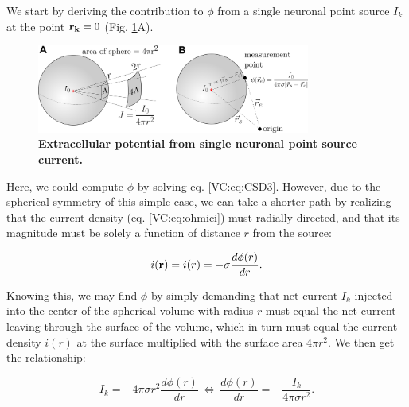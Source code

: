 \subsubsection{}
\label{sec:VC:pointsource}

We start by deriving the contribution to $\phi$ from a single neuronal point source $I_k$ at the point ${\bf r_k}=0$ (Fig. \ref{VC:fig:pointsource}A). 

\begin{figure}[!ht]
\begin{center}
\includegraphics[width=0.8\textwidth]{Figures/VC/EP_from_pointsource_illustration.png}
\end{center}
\caption{\textbf{Extracellular potential from single neuronal point source current.} 
}
\label{VC:fig:pointsource}
\end{figure}

Here, we could compute $\phi$ by solving eq. \ref{VC:eq:CSD3}. However, due to the spherical symmetry of this simple case, we can take a shorter path by realizing that the current density (eq. \ref{VC:eq:ohmici}) must radially directed, and that its magnitude must be solely a function of distance $r$ from the source:

\begin{equation}
i({\bf r}) = i(r) = -\sigma \frac{d\phi(r)}{dr}.
\end{equation}

Knowing this, we may find $\phi$ by simply demanding that net current $I_k$ injected into the center of the spherical volume with radius $r$ must equal the net current leaving through the surface of the volume, which in turn must equal the current density $i(r)$ at the surface multiplied with the surface area $4\pi r^2$. We then get the relationship:

\begin{equation}
I_k = -4\pi \sigma r^2  \frac{d\phi(r)}{dr} \, \iff \, \frac{d\phi(r)}{dr} = -\frac{I_k}{4\pi \sigma r^2 }.
\label{VC:eq:knut}
\end{equation}

